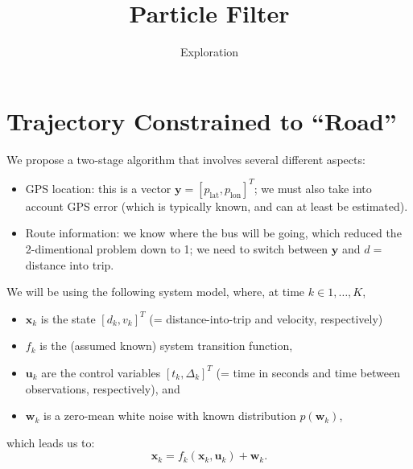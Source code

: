 \documentclass[11pt]{article}\usepackage[]{graphicx}\usepackage[]{color}
\title{Particle Filter}
\author{Exploration}
\date{}
\newcommand{\bx}{\boldsymbol{x}}
\newcommand{\bu}{\boldsymbol{u}}
\newcommand{\bw}{\boldsymbol{w}}
\newcommand{\by}{\boldsymbol{y}}
\begin{document}
\maketitle


\section{Trajectory Constrained to ``Road''}


We propose a two-stage algorithm that involves several different aspects:

\begin{itemize}
\item GPS location: this is a vector $\by = \left[p_{\mathrm{lat}}, p_{\mathrm{lon}}\right]^T$; we
  must also take into account GPS error (which is typically known, and can at least be estimated).
  

\item Route information: we know where the bus will be going, which reduced the 2-dimentional
  problem down to 1; we need to switch between $\by$ and $d = $ distance into trip.
\end{itemize}


We will be using the following system model, where, at time $k \in 1,\ldots,K$, 
\begin{itemize}
\item 
  $\bx_k$ is the state $\left[d_k, v_k\right]^T$ (= distance-into-trip and velocity, respectively)
  
\item
  $f_k$ is the (assumed known) system transition function, 
  
\item
  $\bu_k$ are the control variables $\left[t_k, \Delta_k\right]^T$ (= time in seconds and time between
  observations, respectively), and
  
\item
  $\bw_k$ is a zero-mean white noise with known distribution $p(\bw_k)$,
  
\end{itemize}
which leads us to:
\begin{equation}
  \label{eq:state_model1}
  \bx_k = 
  f_k\left(\bx_k, \bu_k\right) + \bw_k.
\end{equation}
\end{document}
